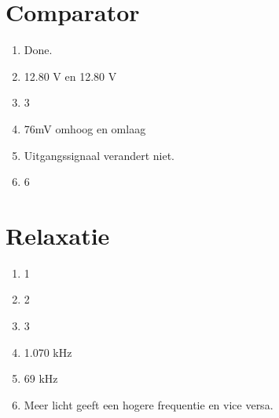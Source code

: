 \documentclass{report}
\begin{document}
\section{Comparator}
\begin{enumerate}
\item Done.
\item 12.80 V en 12.80 V
\item 3
\item 76mV omhoog en omlaag
\item Uitgangssignaal verandert niet.
\item 6
\end{enumerate}
\section{Relaxatie}
\begin{enumerate}
\item 1
\item 2
\item 3
\item 1.070 kHz
\item 69 kHz
\item Meer licht geeft een hogere frequentie en vice versa.
\end{enumerate}
\end{document}
